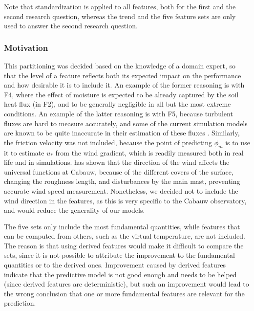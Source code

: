 \documentclass[a4paper,11pt]{kth-mag}
\begin{document}
Note that standardization is applied to all features, both for the first and the second research question, whereas the trend and the five feature sets are only used to answer the second research question.

\subsubsection{Motivation}
This partitioning was decided based on the knowledge of a domain expert, so that the level of a feature reflects both its expected impact on the performance and how desirable it is to include it. An example of the former reasoning is with F4, where the effect of moisture is expected to be already captured by the soil heat flux (in F2), and to be generally negligible in all but the most extreme conditions. An example of the latter reasoning is with F5, because turbulent fluxes are hard to measure accurately, and some of the current simulation models are known to be quite inaccurate in their estimation of these fluxes \citep{sheba}. Similarly, the friction velocity was not included, because the point of predicting $\phi_m$ is to use it to estimate $u_*$ from the wind gradient, which is readily measured both in real life and in simulations. \cite{cabauw_z0} has shown that the direction of the wind affects the universal functions at Cabauw, because of the different covers of the surface, changing the roughness length, and disturbances by the main mast, preventing accurate wind speed measurement. Nonetheless, we decided not to include the wind direction in the features, as this is very specific to the Cabauw observatory, and would reduce the generality of our models.

The five sets only include the most fundamental quantities, while features that can be computed from others, such as the virtual temperature, are not included. The reason is that using derived features would make it difficult to compare the sets, since it is not possible to attribute the improvement to the fundamental quantities or to the derived ones. Improvement caused by derived features indicate that the predictive model is not good enough and needs to be helped (since derived features are deterministic), but such an improvement would lead to the wrong conclusion that one or more fundamental features are relevant for the prediction.
\end{document}
